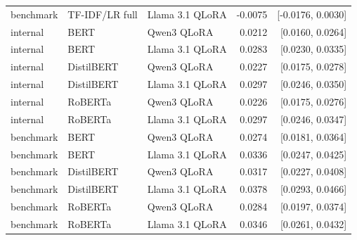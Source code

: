 \documentclass[10pt,a4paper]{article}
\begin{document}
{\begin{longtable}{@{}lllrr@{}}
benchmark & TF-IDF/LR full & Llama 3.1 QLoRA & -0.0075 & [-0.0176, 0.0030] \\
internal & BERT & Qwen3 QLoRA & 0.0212 & [0.0160, 0.0264] \\
internal & BERT & Llama 3.1 QLoRA & 0.0283 & [0.0230, 0.0335] \\
internal & DistilBERT & Qwen3 QLoRA & 0.0227 & [0.0175, 0.0278] \\
internal & DistilBERT & Llama 3.1 QLoRA & 0.0297 & [0.0246, 0.0350] \\
internal & RoBERTa & Qwen3 QLoRA & 0.0226 & [0.0175, 0.0276] \\
internal & RoBERTa & Llama 3.1 QLoRA & 0.0297 & [0.0246, 0.0347] \\
benchmark & BERT & Qwen3 QLoRA & 0.0274 & [0.0181, 0.0364] \\
benchmark & BERT & Llama 3.1 QLoRA & 0.0336 & [0.0247, 0.0425] \\
benchmark & DistilBERT & Qwen3 QLoRA & 0.0317 & [0.0227, 0.0408] \\
benchmark & DistilBERT & Llama 3.1 QLoRA & 0.0378 & [0.0293, 0.0466] \\
benchmark & RoBERTa & Qwen3 QLoRA & 0.0284 & [0.0197, 0.0374] \\
benchmark & RoBERTa & Llama 3.1 QLoRA & 0.0346 & [0.0261, 0.0432] \\
\end{longtable}
}
\end{document}
